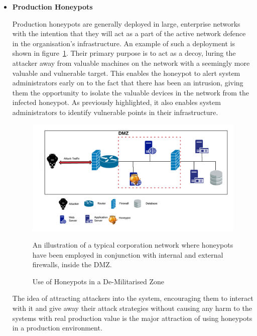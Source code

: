 \begin{itemize}
	\item \textbf{Production Honeypots}
	
	Production honeypots are generally deployed in large, enterprise networks with the intention that they will act as a part of the active network defence in the organisation's infrastructure. An example of such a deployment is shown in figure~\ref{fig:Honeypot_DMZ_Illustration}. Their primary purpose is to act as a decoy, luring the attacker away from valuable machines on the network with a seemingly more valuable and vulnerable target. This enables the honeypot to alert system administrators early on to the fact that there has been an intrusion, giving them the opportunity to isolate the valuable devices in the network from the infected honeypot. As previously highlighted, it also enables system administrators to identify vulnerable points in their infrastructure.



\begin{figure}[ht]
      \centering
      \includegraphics[width=160mm, scale=1]{Images/Illustration_of_Honeypots_with_Firewalls_in_a_DMZ.png}
      \caption{Use of Honeypots in a De-Militarised Zone}
      \medskip
	  \small
		An illustration of a typical corporation network where honeypots have been employed in conjunction with internal and external firewalls, inside the DMZ.
\label{fig:Honeypot_DMZ_Illustration}
\end{figure}
    
	The idea of attracting attackers into the system, encouraging them to interact with it and give away their attack strategies without causing any harm to the systems with real production value is the major attraction of using honeypots in a production environment. 
	

\end{itemize}
